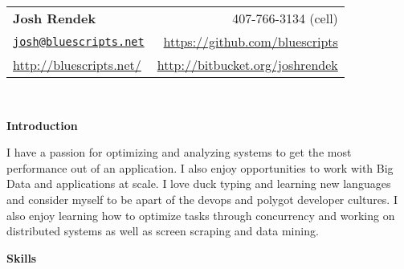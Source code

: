 \documentclass[letterpaper,11pt]{article}
\newcommand{\resheading}[1]{{\large \colorbox{myblue}{\begin{minipage}{\textwidth}{\textbf{#1 \vphantom{p\^{E}}}}\end{minipage}}}}
\begin{document}
\newcommand{\infoheader}{
\begin{tabular*}{7.5in}{l@{\extracolsep{\fill}}r}
\textbf{\LARGE Josh Rendek }  & 407-766-3134 (cell) \\ 
\href{mailto:josh@bluescripts.net}{\nolinkurl{josh@bluescripts.net}} & \url{https://github.com/bluescripts} \\
\url{http://bluescripts.net/} & \url{http://bitbucket.org/joshrendek} \\
\end{tabular*}
\\

\vspace{0.1in}
}

\newcommand{\pagebreakwithheader}{\pagebreak\infoheader}

\infoheader

\resheading{Introduction}
I have a passion for optimizing and analyzing systems to get the most performance out of an application. I also enjoy opportunities to work with Big Data and applications at scale. I love duck typing and learning new languages and consider myself to be apart of the devops and polygot developer cultures. I also enjoy learning how to optimize tasks through concurrency and working on distributed systems as well as screen scraping and data mining.
\linebreak

\resheading{Skills}
\end{document}
